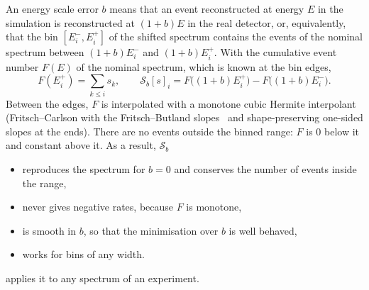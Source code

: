 An energy scale error $b$ means that an event reconstructed at energy $E$ in
the simulation is reconstructed at $(1+b)E$ in the real detector, or,
equivalently, that the bin $[E_i^-,E_i^+]$ of the shifted spectrum contains the
events of the nominal spectrum between $(1+b)E_i^-$ and $(1+b)E_i^+$. With the
cumulative event number $F(E)$ of the nominal spectrum, which is known at the
bin edges,
\begin{equation}
F(E_i^+) = \sum_{k\le i} s_k ,\qquad
\mathcal S_b[s]_i = F\bigl((1+b)E_i^+\bigr) - F\bigl((1+b)E_i^-\bigr).
\label{eq:shift}
\end{equation}
Between the edges, $F$ is interpolated with a monotone cubic Hermite
interpolant (Fritsch--Carlson with the Fritsch--Butland slopes~\cite{Fritsch:1980}
and shape-preserving one-sided slopes at the ends). There are no events outside
the binned range: $F$ is $0$ below it and constant above it. As a result,
$\mathcal S_b$
\begin{itemize}
\item reproduces the spectrum for $b=0$ and conserves the number of events
      inside the range,
\item never gives negative rates, because $F$ is monotone,
\item is smooth in $b$, so that the minimisation over $b$ is well behaved,
\item works for bins of any width.
\end{itemize}
 applies it to any spectrum of an
experiment.

